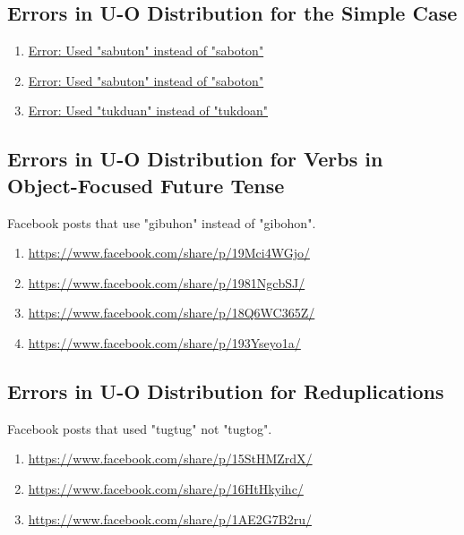 \subsection{Errors in U-O Distribution for the Simple Case}
\begin{enumerate}
    \item \href{https://www.facebook.com/share/p/1DCJL8KWLr/}{Error: Used "sabuton" instead of "saboton"}
    \item \href{https://www.facebook.com/share/p/1BQBPKzNNE/}{Error: Used "sabuton" instead of "saboton"}
    \item \href{https://www.facebook.com/share/p/163t1N1x1b/}{Error: Used "tukduan" instead of "tukdoan"}
\end{enumerate}

\subsection{Errors in U-O Distribution for Verbs in Object-Focused Future Tense}
Facebook posts that use "gibuhon" instead of "gibohon".
\begin{enumerate}
    \item \url{https://www.facebook.com/share/p/19Mci4WGjo/}
    \item \url{https://www.facebook.com/share/p/1981NgcbSJ/}
    \item \url{https://www.facebook.com/share/p/18Q6WC365Z/}
    \item \url{https://www.facebook.com/share/p/193Yseyo1a/}
\end{enumerate}

\subsection{Errors in U-O Distribution for Reduplications}
Facebook posts that used "tugtug" not "tugtog".

\begin{enumerate}
    \item \url{https://www.facebook.com/share/p/15StHMZrdX/}
    \item \url{https://www.facebook.com/share/p/16HtHkyihc/}
    \item \url{https://www.facebook.com/share/p/1AE2G7B2ru/}
\end{enumerate}